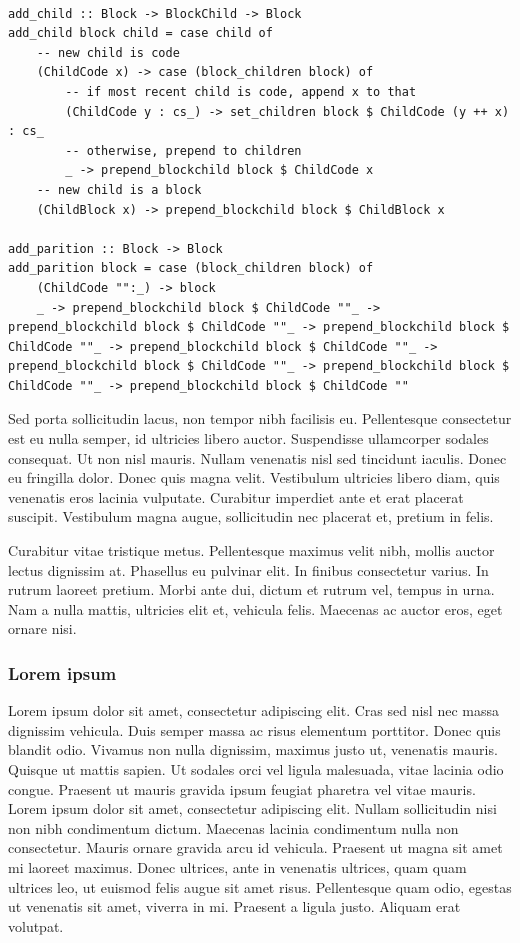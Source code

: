 \documentclass{article}
\begin{document}
\begin{lstlisting}

add_child :: Block -> BlockChild -> Block
add_child block child = case child of
    -- new child is code
    (ChildCode x) -> case (block_children block) of
        -- if most recent child is code, append x to that
        (ChildCode y : cs_) -> set_children block $ ChildCode (y ++ x) : cs_
        -- otherwise, prepend to children
        _ -> prepend_blockchild block $ ChildCode x
    -- new child is a block
    (ChildBlock x) -> prepend_blockchild block $ ChildBlock x

add_parition :: Block -> Block
add_parition block = case (block_children block) of
    (ChildCode "":_) -> block
    _ -> prepend_blockchild block $ ChildCode ""_ -> prepend_blockchild block $ ChildCode ""_ -> prepend_blockchild block $ ChildCode ""_ -> prepend_blockchild block $ ChildCode ""_ -> prepend_blockchild block $ ChildCode ""_ -> prepend_blockchild block $ ChildCode ""_ -> prepend_blockchild block $ ChildCode ""

\end{lstlisting}

 Sed porta sollicitudin lacus, non tempor nibh facilisis eu. Pellentesque consectetur est eu nulla semper, id ultricies libero auctor. Suspendisse ullamcorper sodales consequat. Ut non nisl mauris. Nullam venenatis nisl sed tincidunt iaculis. Donec eu fringilla dolor. Donec quis magna velit. Vestibulum ultricies libero diam, quis venenatis eros lacinia vulputate. Curabitur imperdiet ante et erat placerat suscipit. Vestibulum magna augue, sollicitudin nec placerat et, pretium in felis. 



 Curabitur vitae tristique metus. Pellentesque maximus velit nibh, mollis auctor lectus dignissim at. Phasellus eu pulvinar elit. In finibus consectetur varius. In rutrum laoreet pretium. Morbi ante dui, dictum et rutrum vel, tempus in urna. Nam a nulla mattis, ultricies elit et, vehicula felis. Maecenas ac auctor eros, eget ornare nisi. 

\subsubsection{ Lorem ipsum}

 Lorem ipsum dolor sit amet, consectetur adipiscing elit. Cras sed nisl nec massa dignissim vehicula. Duis semper massa ac risus elementum porttitor. Donec quis blandit odio. Vivamus non nulla dignissim, maximus justo ut, venenatis mauris. Quisque ut mattis sapien. Ut sodales orci vel ligula malesuada, vitae lacinia odio congue. Praesent ut mauris gravida ipsum feugiat pharetra vel vitae mauris. Lorem ipsum dolor sit amet, consectetur adipiscing elit. Nullam sollicitudin nisi non nibh condimentum dictum. Maecenas lacinia condimentum nulla non consectetur. Mauris ornare gravida arcu id vehicula. Praesent ut magna sit amet mi laoreet maximus. Donec ultrices, ante in venenatis ultrices, quam quam ultrices leo, ut euismod felis augue sit amet risus. Pellentesque quam odio, egestas ut venenatis sit amet, viverra in mi. Praesent a ligula justo. Aliquam erat volutpat. 
\end{document}
